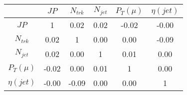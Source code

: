 \begin{tabular}{|c|c|c|c|c|c|} 
\hline
 & $JP$ & $N_{trk}$ & $N_{jet}$ & $P_{T} (\mu)$ & $\eta (jet)$ \\ \hline
$JP$ & 1 & 0.02 & 0.02 & -0.02 & -0.00 \\
$N_{trk}$ & 0.02 & 1 & 0.00 & 0.00 & -0.09 \\
$N_{jet}$ & 0.02 & 0.00 & 1 & 0.01 & 0.00 \\
$P_{T} (\mu)$ & -0.02 & 0.00 & 0.01 & 1 & 0.00 \\
$\eta (jet)$ & -0.00 & -0.09 & 0.00 & 0.00 & 1 \\
\hline 
\end{tabular} 


